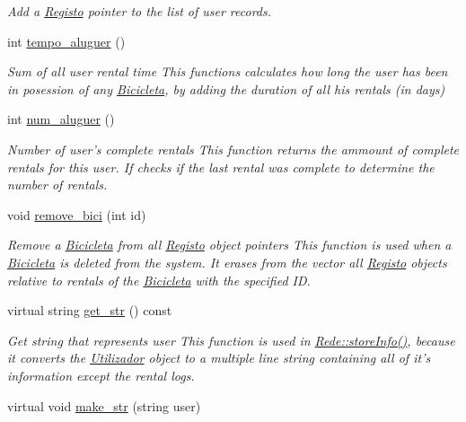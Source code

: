 \begin{DoxyCompactItemize}
\begin{DoxyCompactList}\small\item\em Add a \hyperlink{class_registo}{Registo} pointer to the list of user records. \end{DoxyCompactList}\item 
int \hyperlink{class_utilizador_a72e81f30a09f65dc12ad4388a1bb4c6f}{tempo\+\_\+aluguer} ()
\begin{DoxyCompactList}\small\item\em Sum of all user rental time This functions calculates how long the user has been in posession of any \hyperlink{class_bicicleta}{Bicicleta}, by adding the duration of all his rentals (in days) \end{DoxyCompactList}\item 
int \hyperlink{class_utilizador_a19b8e1ca2d9b0036e041bb9d1813b1be}{num\+\_\+aluguer} ()
\begin{DoxyCompactList}\small\item\em Number of user's complete rentals This function returns the ammount of complete rentals for this user. If checks if the last rental was complete to determine the number of rentals. \end{DoxyCompactList}\item 
void \hyperlink{class_utilizador_aaad55e54d2ab5a5a8dbe0c98092ab77a}{remove\+\_\+bici} (int id)
\begin{DoxyCompactList}\small\item\em Remove a \hyperlink{class_bicicleta}{Bicicleta} from all \hyperlink{class_registo}{Registo} object pointers This function is used when a \hyperlink{class_bicicleta}{Bicicleta} is deleted from the system. It erases from the vector all \hyperlink{class_registo}{Registo} objects relative to rentals of the \hyperlink{class_bicicleta}{Bicicleta} with the specified I\+D. \end{DoxyCompactList}\item 
virtual string \hyperlink{class_utilizador_a79a6281b24b8ecf31b25e41f5650843d}{get\+\_\+str} () const 
\begin{DoxyCompactList}\small\item\em Get string that represents user This function is used in \hyperlink{class_rede_abec1da6660663cd58e6851737219959e}{Rede\+::store\+Info()}, because it converts the \hyperlink{class_utilizador}{Utilizador} object to a multiple line string containing all of it's information except the rental logs. \end{DoxyCompactList}\item 
\hypertarget{class_utilizador_ae2d157ed39a4f4d8e96c288ac7de320d}{virtual void \hyperlink{class_utilizador_ae2d157ed39a4f4d8e96c288ac7de320d}{make\+\_\+str} (string user)}\label{class_utilizador_ae2d157ed39a4f4d8e96c288ac7de320d}


\end{DoxyCompactItemize}
